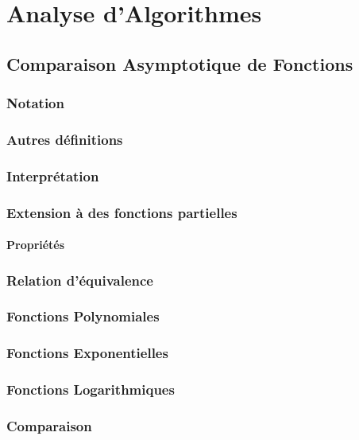\chapter{Analyse d'Algorithmes}\label{chap:algorithmes}
\section{Comparaison Asymptotique de Fonctions}\label{sec:caf}
\subsection{Notation}\label{subsec:notation}
\subsection{Autres définitions}\label{subsec:autresdef}
\subsection{Interprétation}\label{subsec:interpretation}
\subsection{Extension à des fonctions partielles}\label{subsec:extfctspart}
\subsubsection{Propriétés}\label{subsec:propriétés}
\subsection{Relation d'équivalence}\label{subsec:relequival}
\subsection{Fonctions Polynomiales}\label{subsec:fctspoly}
\subsection{Fonctions Exponentielles}\label{subsec:fctsexpo}
\subsection{Fonctions Logarithmiques}\label{subsec:fctslog}
\subsection{Comparaison}\label{subsec:compa}
